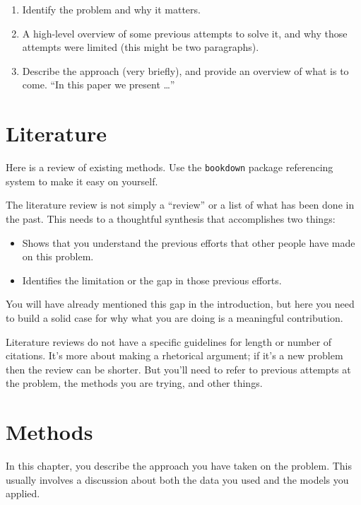 \documentclass[3p, authoryear]{elsarticle} %
\providecommand{\tightlist}{%
  \setlength{\itemsep}{0pt}\setlength{\parskip}{0pt}}
\begin{document}
\begin{enumerate}
\def\labelenumi{\arabic{enumi}.}
\tightlist
\item
  Identify the problem and why it matters.
\item
  A high-level overview of some previous attempts to solve it, and why those
  attempts were limited (this might be two paragraphs).
\item
  Describe the approach (very briefly), and provide an overview of what is
  to come. ``In this paper we present \ldots{}''
\end{enumerate}

\hypertarget{literature}{%
\section{Literature}\label{literature}}

Here is a review of existing methods. Use the \texttt{bookdown} \citep{xie2015} package
referencing system to make it easy on yourself.

The literature review is not simply a ``review'' or a list of what has been
done in the past. This needs to a thoughtful synthesis that accomplishes two
things:

\begin{itemize}
\tightlist
\item
  Shows that you understand the previous efforts that other people have
  made on this problem.
\item
  Identifies the limitation or the gap in those previous efforts.
\end{itemize}

You will have already mentioned this gap in the introduction, but here you need
to build a solid case for why what you are doing is a meaningful contribution.

Literature reviews do not have a specific guidelines for length or number of
citations. It's more about making a rhetorical argument; if it's a new problem
then the review can be shorter. But you'll need to refer to previous attempts at
the problem, the methods you are trying, and other things.

\hypertarget{methods}{%
\section{Methods}\label{methods}}

In this chapter, you describe the approach you have taken on the problem. This
usually involves a discussion about both the data you used and the models you
applied.
\end{document}
